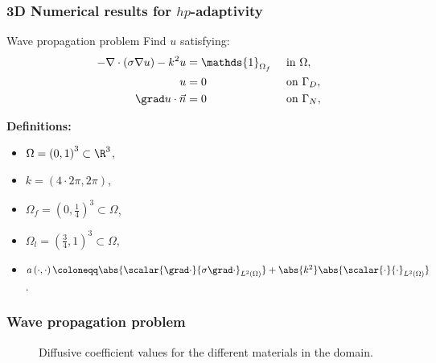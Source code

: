 \begin{frame}
  \frametitle{3D Numerical results for $hp$-adaptivity}
  
  \begin{block}{Wave propagation problem}
     Find \(u\) satisfying:
  \begin{alignat}{2}
    - \nabla \cdot \left( \sigma \nabla u\right) - k^{2}u & = \mathds{1}_{\Omega_{f}} &  & \text{ in } \Omega, \\
    u                                          & =0                        &  & \text{ on } {\Gamma_{D}},                      \\
    \grad u\cdot \vec{n}                       & =0                        &  & \text{ on } {\Gamma_{N}},
  \end{alignat}
  \end{block}

    \textbf{Definitions:}
    \begin{itemize}
      \item \(\Omega = \left(0,1\right)^{3} \subset \R^{3}\),
      \item \(k = \left(4 \cdot 2 \pi, 2 \pi\right)\), 
      \item \( \Omega_{f} = \left(0,\frac{1}{4}\right)^{3} \subset \Omega \),
      \item \(\Omega_{l} = \left(\frac{3}{4},1\right)^{3} \subset \Omega\),
      \item \( a\left(\cdot ,\cdot\right) \coloneqq  \abs{\scalar{\grad \cdot}{\sigma \grad \cdot}_{L^{2}\left(\Omega\right)}} + \abs{k^{2}} \abs{\scalar{\cdot}{\cdot}_{L^{2}\left(\Omega\right)}} \).
    \end{itemize}

\end{frame}

\begin{frame}
\frametitle{Wave propagation problem}
\begin{figure}
  {\caption{Diffusive coefficient values for the different materials in the domain.}
  \label{fig:matHelmtresD}}
\end{figure}
\end{frame}

